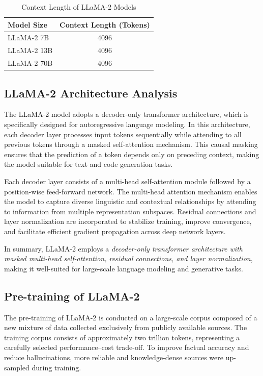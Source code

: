 \begin{table}[htbp]
    \centering
    \caption{Context Length of LLaMA-2 Models}
    \label{tab:llama2_context}
    \begin{tabular}{lc}
        \toprule
        \textbf{Model Size} & \textbf{Context Length (Tokens)} \\
        \midrule
        LLaMA-2 7B  & 4096 \\
        LLaMA-2 13B & 4096 \\
        LLaMA-2 70B & 4096 \\
        \bottomrule
    \end{tabular}
\end{table}

\subsection{LLaMA-2 Architecture Analysis}
The LLaMA-2 model adopts a decoder-only transformer architecture, which is
specifically designed for autoregressive language modeling. In this architecture,
each decoder layer processes input tokens sequentially while attending to all
previous tokens through a masked self-attention mechanism. This causal masking
ensures that the prediction of a token depends only on preceding context, making
the model suitable for text and code generation tasks.



Each decoder layer consists of a multi-head self-attention module followed by a
position-wise feed-forward network. The multi-head attention mechanism enables
the model to capture diverse linguistic and contextual relationships by attending
to information from multiple representation subspaces. Residual connections and
layer normalization are incorporated to stabilize training, improve convergence,
and facilitate efficient gradient propagation across deep network layers.

In summary, LLaMA-2 employs a \textit{decoder-only transformer architecture with
masked multi-head self-attention, residual connections, and layer normalization},
making it well-suited for large-scale language modeling and generative tasks.

\subsection{Pre-training of LLaMA-2}
The pre-training of LLaMA-2 is conducted on a large-scale corpus composed of a
new mixture of data collected exclusively from publicly available sources.
The training corpus consists of approximately two trillion tokens, representing a
carefully selected performance–cost trade-off. To improve factual accuracy and
reduce hallucinations, more reliable and knowledge-dense sources were
up-sampled during training.


